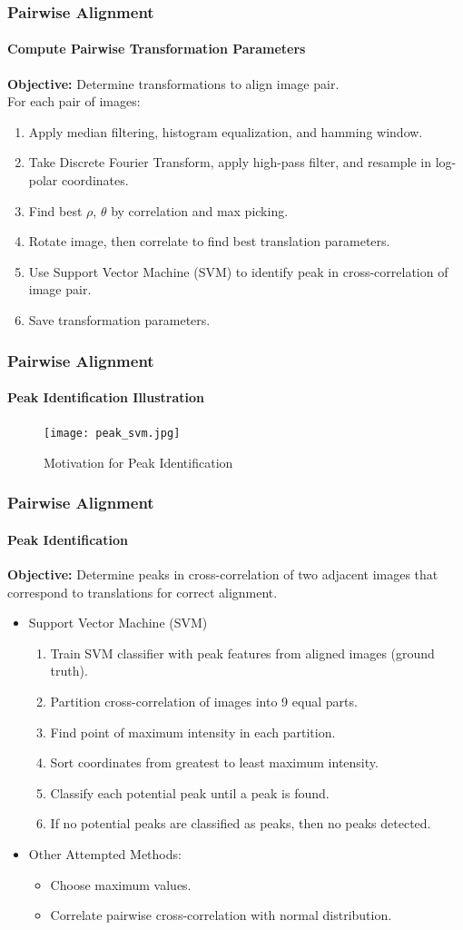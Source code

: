 \documentclass{beamer}
\begin{document}
\begin{frame}
\frametitle{Pairwise Alignment}
\framesubtitle{Compute Pairwise Transformation Parameters}
\textbf{Objective:} Determine transformations to align image pair. \\
For each pair of images:
\begin{enumerate}
\item Apply median filtering, histogram equalization, and hamming window. 
\item Take Discrete Fourier Transform, apply high-pass filter, and resample in log-polar coordinates. 
\item Find best $\rho$, $\theta$ by correlation and max picking. 
\item Rotate image, then correlate to find best translation parameters.
\item Use Support Vector Machine (SVM) to identify peak in cross-correlation of image pair. 
\item Save transformation parameters.
\end{enumerate}
\end{frame}

\begin{frame}
\frametitle{Pairwise Alignment}
\framesubtitle{Peak Identification Illustration}
\begin{figure}[p]
	\centering
	\texttt{[image: peak\_svm.jpg]}
	\caption{Motivation for Peak Identification}
\end{figure}
\end{frame}

\begin{frame}
\frametitle{Pairwise Alignment}
\framesubtitle{Peak Identification}
\textbf{Objective:} Determine peaks in cross-correlation of two adjacent images that correspond to translations for correct alignment. \\
\begin{itemize}
\item Support Vector Machine (SVM)
\begin{enumerate}
\item Train SVM classifier with peak features from aligned images (ground truth).
\item Partition cross-correlation of images into 9 equal parts.
\item Find point of maximum intensity in each partition.
\item Sort coordinates from greatest to least maximum intensity.
\item Classify each potential peak until a peak is found.
\item If no potential peaks are classified as peaks, then no peaks detected.
\end{enumerate}
\item Other Attempted Methods:
\begin{itemize}
\item Choose maximum values.
\item Correlate pairwise cross-correlation with normal distribution. 
\end{itemize}
\end{itemize}
\end{frame}
\end{document}
